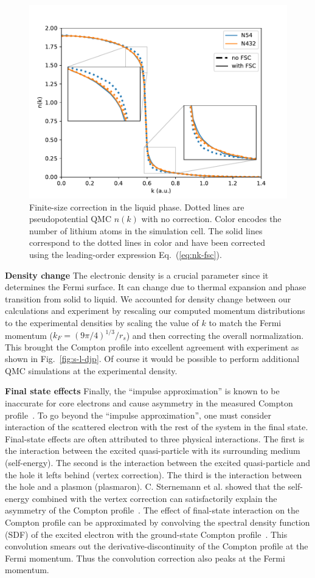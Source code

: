 \begin{figure}[h]
\centering
\includegraphics[width=0.8\linewidth]{li58h_liquid-fsc}
\caption{Finite-size correction in the liquid phase. Dotted lines are pseudopotential QMC $n(k)$ with no correction. Color encodes the number of lithium atoms in the simulation cell. The solid lines correspond to the dotted lines in color and have been corrected using the leading-order expression Eq.~(\ref{eq:nk-fsc}). \label{fig:liquid-nk-fsc}}
\end{figure}

{\bf Density change} The electronic density is a crucial parameter since it determines the Fermi surface. It can change due to thermal expansion and phase transition from solid to liquid.
We accounted for density change between our calculations and experiment by rescaling our computed momentum distributions to the experimental densities by scaling the value of $k$ to match the Fermi momentum ($k_F=(9\pi/4)^{1/3}/r_s$) and then correcting the overall normalization.
This brought the Compton profile into excellent agreement with experiment as shown in Fig.~\ref{fig:s-l-djp}.  Of course it would be possible to perform additional QMC simulations at the experimental density. 

{\bf Final state effects} Finally, the ``impulse approximation'' is known to be inaccurate for core electrons and cause asymmetry in the measured Compton profile~\cite{Eisenberger1970,Sternemann2000,Huotari2001}. To go beyond the ``impulse approximation'', one must consider interaction of the scattered electron with the rest of the system in the final state. Final-state effects are often attributed to three physical interactions. The first is the interaction between the excited quasi-particle with its surrounding medium (self-energy). The second is the interaction between the excited quasi-particle and the hole it lefts behind (vertex correction). The third is the interaction between the hole and a plasmon (plasmaron). C. Sternemann et al. showed that the self-energy combined with the vertex correction can satisfactorily explain the asymmetry of the Compton profile~\cite{Sternemann2000}. The effect of final-state interaction on the Compton profile can be approximated by convolving the spectral density function (SDF) of the excited electron with the ground-state Compton profile~\cite{Soininen2001}. This convolution smears out the derivative-discontinuity of the Compton profile at the Fermi momentum. Thus the convolution correction also peaks at the Fermi momentum.

